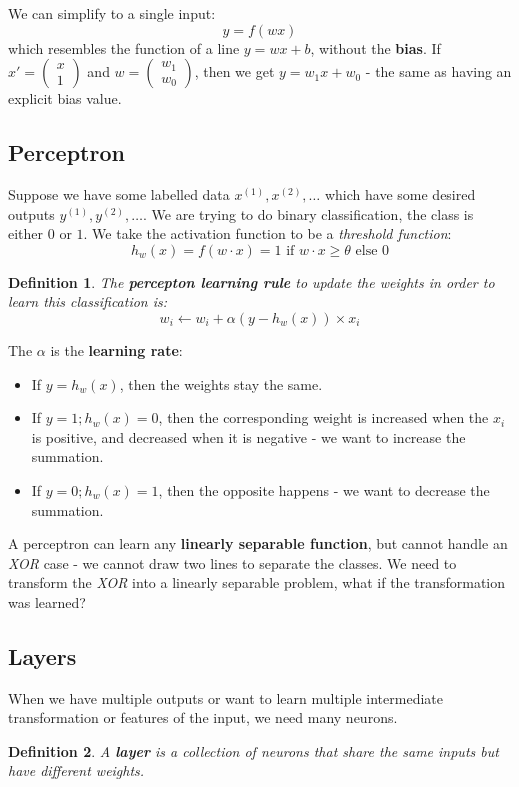 \documentclass[11pt]{article}
\newtheorem{defn}{Definition}
\begin{document}
We can simplify to a single input:
\[
  y = f(wx) 
\]
which resembles the function of a line $y = wx + b$, without the \textbf{bias}.
If $x' = \begin{pmatrix} x \\ 1 \end{pmatrix}$ and $w = \begin{pmatrix} w_1 \\ w_0 \end{pmatrix}$, then we get $y = w_1 x + w_0$ - the same as having an explicit bias value.

\subsection{Perceptron}
Suppose we have some labelled data $x^{(1)}, x^{(2)}, \dots$ which have some desired outputs $y^{(1)}, y^{(2)}, \dots$.
We are trying to do binary classification, the class is either $0$ or $1$.
We take the activation function to be a \textit{threshold function}:
\[
  h_w(x) = f(w \cdot x) = 1 \text{ if } w \cdot x \geq \theta \text{ else } 0
\]

\begin{defn}
  The \textbf{percepton learning rule} to update the weights in order to learn this classification is:
  \[
    w_i \leftarrow w_i + \alpha(y - h_w(x)) \times x_i
  \]
\end{defn}
The $\alpha$ is the \textbf{learning rate}:
\begin{itemize}
  \item If $y = h_w(x)$, then the weights stay the same.
  \item If $y = 1; h_w(x) = 0$, then the corresponding weight is increased when the $x_i$ is positive, and decreased when it is negative - we want to increase the summation.
  \item If $y = 0; h_w(x) = 1$, then the opposite happens - we want to decrease the summation.
\end{itemize}

A perceptron can learn any \textbf{linearly separable function}, but cannot handle an \textit{XOR} case - we cannot draw two lines to separate the classes.
We need to transform the \textit{XOR} into a linearly separable problem, what if the transformation was learned?

\subsection{Layers}
When we have multiple outputs or want to learn multiple intermediate transformation or features of the input, we need many neurons.
\begin{defn}
  A \textbf{layer} is a collection of neurons that share the same inputs but have different weights.
\end{defn}
\end{document}
